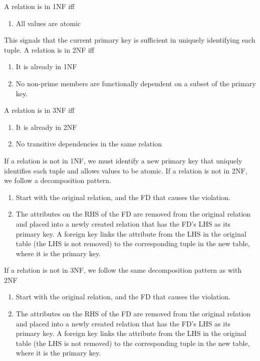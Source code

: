 \documentclass{report}
\begin{document}
    \bigbreak \noindent 
    \begin{remark} 
       A relation is in 1NF iff 
       \begin{enumerate}
           \item All values are atomic
       \end{enumerate}
       This signals that the current primary key is sufficient in uniquely identifying each tuple.
       \bigbreak \noindent 
       A relation is in 2NF iff
       \begin{enumerate}
           \item It is already in 1NF
            \item No non-prime members are functionally dependent on a subset of the primary key.
       \end{enumerate}
       \bigbreak \noindent 
       A relation is in 3NF iff
       \begin{enumerate}
           \item It is already in 2NF
            \item No transitive dependencies in the same relation
       \end{enumerate}
    \end{remark}
    \bigbreak \noindent 
    \begin{remark} If a relation is not in 1NF, we must identify a new primary key that uniquely identifies each tuple and allows values to be atomic.
        \bigbreak \noindent 
        If a relation is not in 2NF, we follow a decomposition pattern.
        \begin{enumerate}
            \item Start with the original relation, and the FD that causes the violation.
            \item The attributes on the RHS of the FD are removed from the original relation and placed into a newly created relation that has the FD’s LHS as its primary key. A foreign key links the attribute from the LHS in the original table (the LHS is not removed) to the corresponding tuple in the new table, where it is the primary key.
        \end{enumerate}
        \bigbreak \noindent 
        If a relation is not in 3NF, we follow the same decomposition pattern as with 2NF
        \begin{enumerate}
             \item Start with the original relation, and the FD that causes the violation.
            \item The attributes on the RHS of the FD are removed from the original relation and placed into a newly created relation that has the FD’s LHS as its primary key. A foreign key links the attribute from the LHS in the original table (the LHS is not removed) to the corresponding tuple in the new table, where it is the primary key.
        \end{enumerate}
    \end{remark}
    
\end{document}
